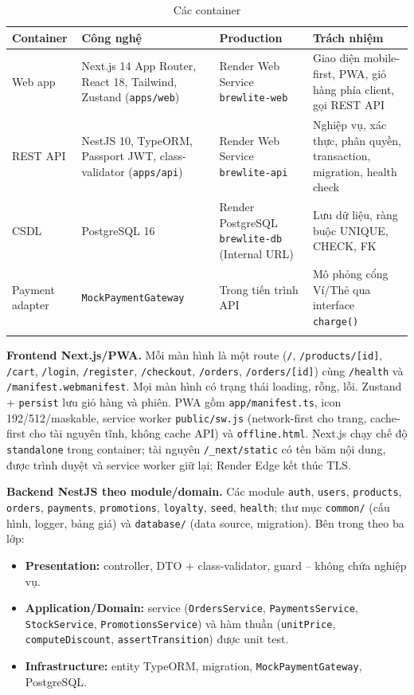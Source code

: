 \documentclass[a4paper]{article}
\newcommand{\st}[1]{\texttt{#1}}
\begin{document}
\begin{longtable}{|L{2.2cm}|L{3.9cm}|L{3.5cm}|L{5cm}|}
\hline
\textbf{Container} & \textbf{Công nghệ} & \textbf{Production} & \textbf{Trách nhiệm} \\ \hline
\endhead
Web app & Next.js 14 App Router, React 18, Tailwind, Zustand (\st{apps/web}) & Render Web Service \st{brewlite-web} & Giao diện mobile-first, PWA, giỏ hàng phía client, gọi REST API \\ \hline
REST API & NestJS 10, TypeORM, Passport JWT, class-validator (\st{apps/api}) & Render Web Service \st{brewlite-api} & Nghiệp vụ, xác thực, phân quyền, transaction, migration, health check \\ \hline
CSDL & PostgreSQL 16 & Render PostgreSQL \st{brewlite-db} (Internal URL) & Lưu dữ liệu, ràng buộc UNIQUE, CHECK, FK \\ \hline
Payment adapter & \st{MockPaymentGateway} & Trong tiến trình API & Mô phỏng cổng Ví/Thẻ qua interface \st{charge()} \\ \hline
\caption{Các container}
\end{longtable}

\textbf{Frontend Next.js/PWA.} Mỗi màn hình là một route (\st{/}, \st{/products/[id]}, \st{/cart}, \st{/login}, \st{/register}, \st{/checkout}, \st{/orders}, \st{/orders/[id]}) cùng \st{/health} và \st{/manifest.webmanifest}. Mọi màn hình có trạng thái loading, rỗng, lỗi. Zustand + \st{persist} lưu giỏ hàng và phiên. PWA gồm \st{app/manifest.ts}, icon 192/512/maskable, service worker \st{public/sw.js} (network-first cho trang, cache-first cho tài nguyên tĩnh, không cache API) và \st{offline.html}. Next.js chạy chế độ \st{standalone} trong container; tài nguyên \st{/\_next/static} có tên băm nội dung, được trình duyệt và service worker giữ lại; Render Edge kết thúc TLS.

\textbf{Backend NestJS theo module/domain.} Các module \st{auth}, \st{users}, \st{products}, \st{orders}, \st{payments}, \st{promotions}, \st{loyalty}, \st{seed}, \st{health}; thư mục \st{common/} (cấu hình, logger, bảng giá) và \st{database/} (data source, migration). Bên trong theo ba lớp:
\begin{itemize}
  \item \textbf{Presentation:} controller, DTO + class-validator, guard -- không chứa nghiệp vụ.
  \item \textbf{Application/Domain:} service (\st{OrdersService}, \st{PaymentsService}, \st{StockService}, \st{PromotionsService}) và hàm thuần (\st{unitPrice}, \st{computeDiscount}, \st{assertTransition}) được unit test.
  \item \textbf{Infrastructure:} entity TypeORM, migration, \st{MockPaymentGateway}, PostgreSQL.
\end{itemize}
\end{document}
